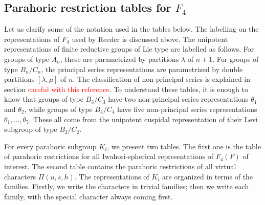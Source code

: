 \subsection{Parahoric restriction tables for \texorpdfstring{$F_4$}{PDFstring}}

Let us clarify some of the notation used in the tables below. The labelling on the representations of $F_4$ used by Reeder is discussed above. The unipotent representations of finite reductive groups of Lie type are labelled as follows. For groups of type $A_n$, these are parametrized by partitions $\lambda$ of $n+1$. For groups of type $B_n/C_n$, the principal series representations are parametrized by double partitions $[\lambda,\mu]$ of $n$. The classification of non-principal series is explained in section \textcolor{red}{careful with this reference}. To understand these tables, it is enough to know that groups of type $B_3/C_3$ have two non-principal series representations $\theta_1$ and $\theta_2$, while groups of type $B_4/C_4$ have five non-principal series representations $\theta_1,\ldots,\theta_5$. These all come from the unipotent cuspidal representation of their Levi subgroup of type $B_2/C_2$. 


For every parahoric subgroup $K_i$, we present two tables. The first one is the table of parahoric restrictions for all Iwahori-spherical representations of $F_4(F)$ of interest. The second table contains the parahoric restrictions of all virtual characters $\Pi(u,s,h)$. The representations of $\overline{K}_i$ are organized in terms of the families. Firstly, we write the characters in trivial families; then we write each family, with the special character always coming first. 

